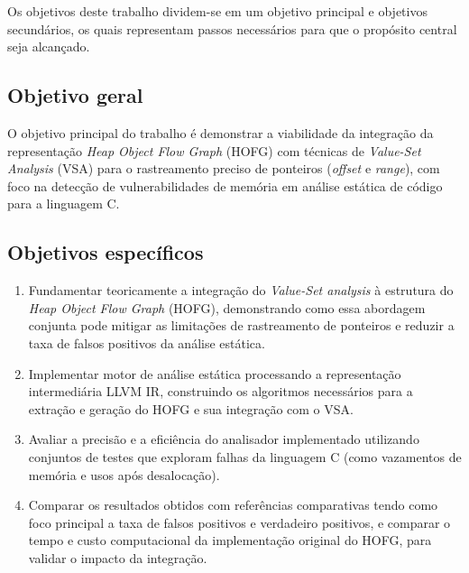 \documentclass[
    12pt,                %
    openright,           %
    oneside,             %
    a4paper,             %
    english,             %
    brazil               %
]{abntex2}
\begin{document}
Os objetivos deste trabalho dividem-se em um objetivo principal e objetivos secundários, os quais representam passos necessários para que o propósito central seja alcançado.

\subsection{Objetivo geral}
\label{sec:Objetivo_geral}

O objetivo principal do trabalho é demonstrar a viabilidade da integração da representação \textit{Heap Object Flow Graph} (HOFG) com técnicas de \textit{Value-Set Analysis} (VSA) para o rastreamento preciso de ponteiros (\textit{offset} e \textit{range}), com foco na detecção de vulnerabilidades de memória em análise estática de código para a linguagem C.

\subsection{Objetivos específicos}
\label{sec:Objetivos_especificos}

\begin{enumerate}
    \item Fundamentar teoricamente a integração do \textit{Value-Set analysis} à estrutura do \textit{Heap Object Flow Graph} (HOFG), demonstrando como essa abordagem conjunta pode mitigar as limitações de rastreamento de ponteiros e reduzir a taxa de falsos positivos da análise estática.
    \item Implementar motor de análise estática processando a representação intermediária LLVM IR, construindo os algoritmos necessários para a extração e geração do HOFG e sua integração com o VSA.
    \item Avaliar a precisão e a eficiência do analisador implementado utilizando conjuntos de testes que exploram falhas da linguagem C (como vazamentos de memória e usos após desalocação). 
    \item Comparar os resultados obtidos com referências comparativas tendo como foco principal a taxa de falsos positivos e verdadeiro positivos, e comparar o tempo e custo computacional da implementação original do HOFG, para validar o impacto da integração.
\end{enumerate}


\end{document}
